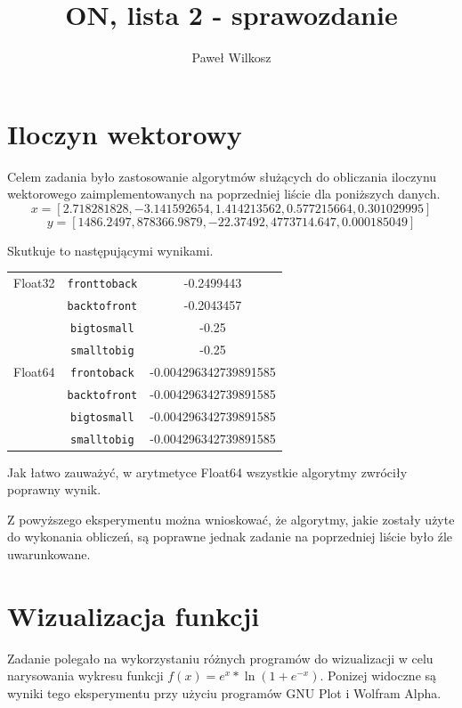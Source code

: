\documentclass{article}
\author{Paweł Wilkosz}
\title{ON, lista 2 - sprawozdanie}
\begin{document}
\maketitle

\section{Iloczyn wektorowy}

Celem zadania było zastosowanie algorytmów służących do obliczania iloczynu wektorowego zaimplementowanych na poprzedniej liście dla poniższych danych.
$$
x = [2.718281828, -3.141592654, 1.414213562, 0.577215664, 0.301029995]
$$
$$
y = [1486.2497, 878366.9879, -22.37492, 4773714.647, 0.000185049]
$$

Skutkuje to następującymi wynikami.

\begin{center}
  \begin{tabular}{| c | c | c |}
    \hline
    Float32 & \texttt{fronttoback} & -0.2499443 \\
    & \texttt{backtofront} & -0.2043457 \\
    & \texttt{bigtosmall} & -0.25 \\
    & \texttt{smalltobig} & -0.25 \\
    \hline
    Float64 & \texttt{frontoback} &-0.004296342739891585 \\
    & \texttt{backtofront} &-0.004296342739891585 \\
    & \texttt{bigtosmall} &-0.004296342739891585 \\
    & \texttt{smalltobig} &-0.004296342739891585 \\
    \hline
  \end{tabular}
\end{center}

Jak łatwo zauważyć, w arytmetyce Float64 wszystkie algorytmy zwróciły poprawny wynik.

Z powyższego eksperymentu można wnioskować, że algorytmy, jakie zostały użyte do wykonania obliczeń, są poprawne jednak zadanie na poprzedniej liście było źle uwarunkowane.

\section{Wizualizacja funkcji}

Zadanie polegało na wykorzystaniu różnych programów do wizualizacji w celu narysowania wykresu funkcji $f(x) = e^x * \ln (1 + e^{-x})$.
Ponizej widoczne są wyniki tego eksperymentu przy użyciu programów GNU Plot i Wolfram Alpha.
\end{document}
